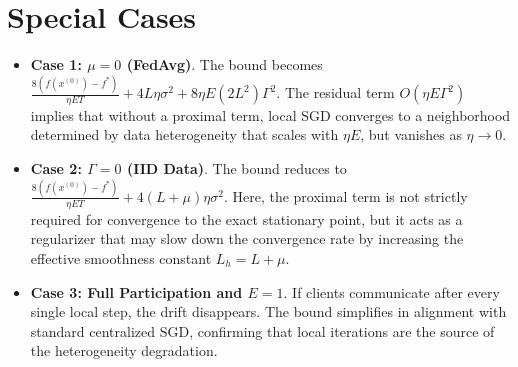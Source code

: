 \documentclass{article}
\begin{document}
\section*{Special Cases}
\begin{itemize}
\item \textbf{Case 1: $\mu = 0$ (FedAvg)}. The bound becomes $\frac{8(f(x^{(0)}) - f^*)}{\eta E T} + 4L \eta \sigma^2 + 8\eta E (2L^2) \Gamma^2$. The residual term $O(\eta E \Gamma^2)$ implies that without a proximal term, local SGD converges to a neighborhood determined by data heterogeneity that scales with $\eta E$, but vanishes as $\eta \to 0$.
\item \textbf{Case 2: $\Gamma = 0$ (IID Data)}. The bound reduces to $\frac{8(f(x^{(0)}) - f^*)}{\eta E T} + 4(L+\mu) \eta \sigma^2$. Here, the proximal term is not strictly required for convergence to the exact stationary point, but it acts as a regularizer that may slow down the convergence rate by increasing the effective smoothness constant $L_h = L + \mu$.
\item \textbf{Case 3: Full Participation and $E=1$}. If clients communicate after every single local step, the drift disappears. The bound simplifies in alignment with standard centralized SGD, confirming that local iterations are the source of the heterogeneity degradation.
\end{itemize}
\end{document}

